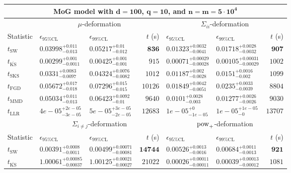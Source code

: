 \begin{tabular}{l|llr|llr}
	\toprule
	\multicolumn{7}{c}{{\bf MoG model with $\mathbf{d=100}$, $\mathbf{q=10}$, and $\mathbf{n=m=5\cdot 10^{4}}$}} \\
	\toprule
	\multicolumn{1}{c}{} & \multicolumn{3}{c}{$\mu$-deformation} & \multicolumn{3}{c}{$\Sigma_{ii}$-deformation} \\
	Statistic & $\epsilon_{95\%\mathrm{CL}}$ & $\epsilon_{99\%\mathrm{CL}}$ & $t$ (s) & $\epsilon_{95\%\mathrm{CL}}$ & $\epsilon_{99\%\mathrm{CL}}$ & $t$ (s) \\
	\midrule
	$t_{\mathrm{SW}}$ & $0.03998_{-0.013}^{+0.011}$ & $0.05217_{-0.012}^{+0.01}$ & ${\mathbf{836}}$ & $0.01323_{-0.0041}^{+0.0032}$ & $0.01718_{-0.0032}^{+0.0028}$ & ${\mathbf{907}}$ \\
	$t_{\overline{\mathrm{KS}}}$ & ${\mathbf{0.00299_{-0.0011}^{+0.001}}}$ & ${\mathbf{0.00425_{-0.001}^{+0.001}}}$ & $915$ & ${\mathbf{0.00071_{-0.00028}^{+0.00029}}}$ & ${\mathbf{0.00105_{-0.00029}^{+0.00031}}}$ & $1002$ \\
	$t_{\mathrm{SKS}}$ & $0.0331_{-0.0097}^{+0.0083}$ & $0.04324_{-0.0082}^{+0.0076}$ & $1012$ & $0.01187_{-0.0028}^{+0.002}$ & $0.0151_{-0.002}^{+0.0016}$ & $1099$ \\
	$t_{\mathrm{FGD}}$ & $0.05672_{-0.018}^{+0.017}$ & $0.07296_{-0.015}^{+0.015}$ & $10126$ & $0.01849_{-0.0051}^{+0.0042}$ & $0.0235_{-0.0039}^{+0.0033}$ & $8804$ \\
	$t_{\mathrm{MMD}}$ & $0.05034_{-0.013}^{+0.011}$ & $0.06423_{-0.01}^{+0.0092}$ & $9640$ & $0.0101_{-0.003}^{+0.0028}$ & $0.01277_{-0.0026}^{+0.0026}$ & $9030$ \\
	$t_{\mathrm{LLR}}$ & $4e-05_{-3e-05}^{+2e-05}$ & $5e-05_{-2e-05}^{+3e-05}$ & $12683$ & $1e-05_{-1e-05}^{+0}$ & $1e-05_{-0}^{+1e-05}$ & $13707$ \\
	\toprule
	\multicolumn{1}{c}{} & \multicolumn{3}{c}{$\Sigma_{i\neq j}$-deformation} & \multicolumn{3}{c}{$\rm{pow}_{+}$-deformation} \\
	Statistic & $\epsilon_{95\%\mathrm{CL}}$ & $\epsilon_{99\%\mathrm{CL}}$ & $t$ (s) & $\epsilon_{95\%\mathrm{CL}}$ & $\epsilon_{99\%\mathrm{CL}}$ & $t$ (s) \\
	\midrule
	$t_{\mathrm{SW}}$ & $0.00391_{-0.0011}^{+0.0008}$ & $0.00499_{-0.00081}^{+0.00071}$ & ${\mathbf{14744}}$ & $0.00526_{-0.0016}^{+0.0013}$ & $0.00684_{-0.0013}^{+0.0011}$ & ${\mathbf{921}}$ \\
	$t_{\overline{\mathrm{KS}}}$ & $1.00061_{-0.00037}^{+0.00085}$ & $1.00125_{-0.00027}^{+0.00021}$ & $21022$ & ${\mathbf{0.00026_{-0.00011}^{+0.00011}}}$ & ${\mathbf{0.00039_{-0.00012}^{+0.00013}}}$ & $1081$ \\

\end{tabular}
